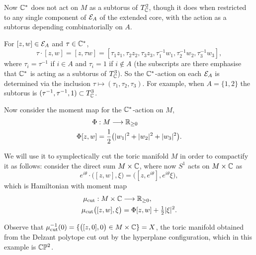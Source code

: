 \newpage

Now $\mathbb{C}^{\ast}$ does not act on $M$ as a subtorus of $T^{2}_{\mathbb{C}}$, though it does when restricted to any single component of $\mathcal{E}_{A}$ of the extended core, with the action as a subtorus depending combinatorially on $A$.

For $[z,w] \in \mathcal{E}_{A}$ and $\tau \in \mathbb{C}^{\ast}$,
\begin{equation*}
	\tau\cdot [z,w] = [z,\tau w] = [ \tau_{1}z_{1}, \tau_{2}z_{2}, \tau_{3}z_{3}, \tau_{1}^{-1}w_{1}, \tau_{2}^{-1}w_{2}, \tau_{3}^{-1}w_{3}],
\end{equation*}
where $\tau_{i} = \tau^{-1}$ if $i \in A$ and $\tau_{i} = 1$ if $i \not\in A$ (the subscripts are there emphasise that $\mathbb{C}^{\ast}$ is acting as a subtorus of $T^{3}_{\mathbb{C}}$). So the $\mathbb{C}^{\ast}$-action on each $\mathcal{E}_{A}$ is determined via the inclusion $\tau \mapsto (\tau_{1}, \tau_{2},\tau_{3})$. For example, when $A = \{1,2\}$ the subtorus is $(\tau^{-1}, \tau^{-1}, 1) \subset T^{3}_{\mathbb{C}}$.

Now consider the moment map for the $\mathbb{C}^{\ast}$-action on $M$,
\begin{equation*}
	\begin{split}
	\Phi &:M \longrightarrow \mathbb{R}_{\geq 0}\\
	\Phi[z,w] &= \frac{1}{2}\big(|w_{1}|^{2} + |w_{2}|^{2} + |w_{3}|^{2}\big).
	\end{split}
\end{equation*}

We will use it to symplectically cut the toric \HK manifold $M$ in order to compactify it as follows: consider the direct sum $M \times \mathbb{C}$, where now $S^{1}$ acts on $M \times \mathbb{C}$ as
$$
	e^{i\theta} \cdot \big( [z,w], \xi   \big) = \big( [z,e^{i\theta}], e^{i\theta}\xi\big),
$$
which is Hamiltonian with moment map
\begin{equation*}
\begin{split}
	\mu_{\text{cut}}:M \times \mathbb{C} &\longrightarrow \mathbb{R}_{\geq 0}, \\
		\mu_{\text{cut}}\big( [z,w], \xi  \big) &= \Phi[z,w] + \tfrac{1}{2}|\xi|^{2}.
\end{split}
\end{equation*}

Observe that $\mu_{\text{cut}}^{-1}(0) = \{ \big([z,0], 0\big) \in M \times \mathbb{C} \} = X$, the toric \K manifold obtained from the Delzant polytope cut out by the hyperplane configuration, which in this example is $\mathbb{C}\mathbb{P}^{2}$.

